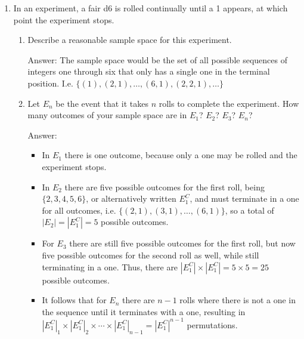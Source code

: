 \documentclass{article}
\begin{document}
\begin{enumerate}
\begin{enumerate}
                Answer: 
                $$ 1 \times 3 + 3 \times 6 + 6 \times 1 = 27 $$
                And, this may be thought of as a sequence of three possible items in three possible positions, that is to say $x$, $y$, or $z$ in the first, second or third positions, which would then be a simpler calculation of $3^3=27$ possible arrangements.

        \end{enumerate}

    \clearpage

    \item In an experiment, a fair d6 is rolled continually until a 1 appears, at which point the experiment stops.

        \begin{enumerate}
            \item Describe a reasonable sample space for this experiment.

                Answer:
                The sample space would be the set of all possible sequences of integers one through six that only has a single one in the terminal position. I.e. $\{(1), (2,1), \ldots, (6,1), (2,2,1),\ldots\}$


            \item Let $E_n$ be the event that it takes $n$ rolls to complete the experiment. How many outcomes of your sample space are in $E_1$? $E_2$? $E_3$? $E_n$?

                Answer:
                \begin{itemize}
                    \item In $E_1$ there is one outcome, because only a one may be rolled and the experiment stops.
                    \item In $E_2$ there are five possible outcomes for the first roll, being $\{2,3,4,5,6\}$, or alternatively written $E_1^C$, and must terminate in a one for all outcomes, i.e. $\{ (2,1), (3,1), \ldots, (6,1) \}$, so a total of $|E_2| = |E_1^C| = 5$ possible outcomes.
                    \item For $E_3$ there are still five possible outcomes for the first roll, but now five possible outcomes for the second roll as well, while still terminating in a one. Thus, there are $|E_1^C| \times |E_1^C| = 5 \times 5 = 25$ possible outcomes.
                \item It follows that for $E_n$ there are $n - 1$ rolls where there is not a one in the sequence until it terminates with a one, resulting in $|E_1^C|_1 \times |E_1^C|_2 \times \cdots \times |E_1^C|_{n-1} = |E_1^C|^{n-1}$ permutations.
                \end{itemize}


\end{enumerate}
\end{enumerate}
\end{document}
